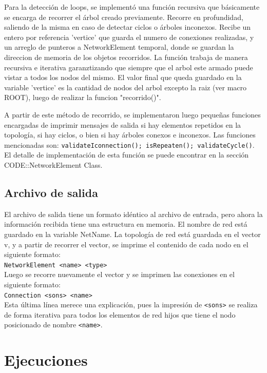 \documentclass[10pt,a4paper]{article}
\begin{document}
Para la detección de loops, se implementó una función recursiva que básicamente se encarga de recorrer el árbol creado previamente. Recorre en profundidad, saliendo de la misma en caso de detectar ciclos o árboles inconexos. Recibe un entero  por referencia 'vertice' que guarda el numero de conexiones realizadas, y un arreglo de punteros a NetworkElement temporal, donde se guardan la direccion de memoria de los objetos recorridos. La función trabaja de manera recursiva e iterativa garanztizando que siempre que el arbol este armado puede vistar a todos los nodos del mismo.  El valor final que queda guardado en la variable 'vertice' es la cantidad de nodos del arbol excepto la raiz (ver macro ROOT), luego de realizar la funcion "recorrido()".

A partir de este método de recorrido, se implementaron luego pequeñas funciones encargadas de imprimir mensajes de salida si hay elementos repetidos en la topología, si hay ciclos, o bien si hay árboles conexos e inconexos. Las funciones mencionadas son:
\texttt{validateIconnection(); isRepeaten(); validateCycle()}.\\

El detalle de implementación de esta función se puede encontrar en la sección CODE::NetworkElement Class.\\


\subsection{Archivo de salida}

El archivo de salida tiene un formato idéntico al archivo de entrada, pero ahora la información recibida tiene una estructura en memoria. El nombre de red está guardado en la variable NetName. La topología de red está guardada en el vector v, y a partir de recorrer el vector, se imprime el contenido de cada nodo en el siguiente formato: \\
\texttt{NetworkElement <name> <type>}\\
Luego se recorre nuevamente el vector y se imprimen las conexiones en el siguiente formato:\\
\texttt{Connection <sons> <name> }\\
Esta última línea merece una explicación, pues la impresión de \texttt{<sons>} se realiza de forma iterativa para todos los elementos de red hijos que tiene el nodo posicionado de nombre \texttt{<name>}.\\

\section{Ejecuciones}
\end{document}
